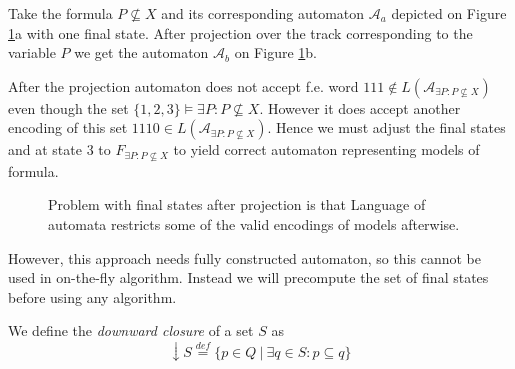 \noindent\hrulefill
\begin{example}
 Take the formula $P \not\subseteq X$ and its corresponding automaton
 $\mathcal{A}_a$ depicted on Figure \ref{projection}a with one final state.
 After projection over the track corresponding to the variable $P$ we get the
 automaton $\mathcal{A}_b$ on Figure \ref{projection}b.
 
 After the projection automaton does not accept f.e. word $111 \notin
 L(\mathcal{A}_{\exists P: P \not\subseteq X})$ even though the set $\{1, 2,
 3\} \models \exists P: P \not\subseteq X$. However it does accept another
 encoding of this set $1110 \in L(\mathcal{A}_{\exists P: P \not\subseteq X})$.
 Hence we must adjust the final states and at state $3$ to $F_{\exists P: P
 \not\subseteq X}$ to yield correct automaton representing models of formula.
 
 \begin{figure}[h!]
  \begin{center}
  \end{center}
  \caption{Problem with final states after projection is that
  Language of automata restricts some of the valid encodings
  of models afterwise.}\label{projection}
 \end{figure}\label{models}
 
\end{example}

\noindent\hrulefill

However, this approach needs fully constructed automaton, so this cannot be used
in on-the-fly algorithm. Instead we will precompute the set of final states
before using any algorithm. 

\begin{defz}
 We define the \emph{downward closure} of a set $S$ as 
 \begin{equation}
  \downarrow S \overset{\mathit{def}}{=} \{p\in Q\ |\ \exists q \in S: p
  \subseteq q\}
 \end{equation}
\end{defz}

